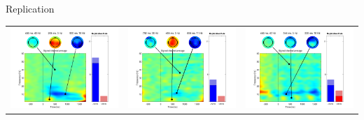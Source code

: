 \documentclass[final]{beamer}
\begin{document}
\begin{frame}{}
\begin{textblock}{63}
\begin{block}{Replication}
\begin{tabular}{c c c}
\includegraphics{gamma01} & \includegraphics{gamma02} & \includegraphics{gamma03} \\

\end{tabular}
\end{block}
\end{textblock}
\end{frame}
\end{document}
